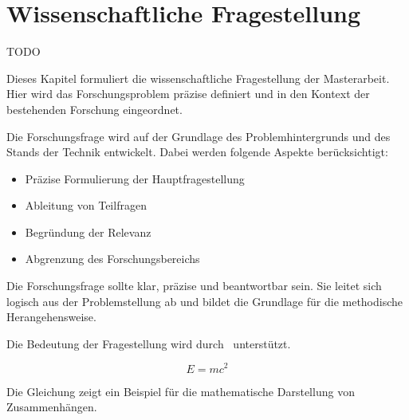 
\chapter{Wissenschaftliche Fragestellung}\label{cha:researchQuestion}

TODO

Dieses Kapitel formuliert die wissenschaftliche Fragestellung der Masterarbeit.
Hier wird das Forschungsproblem präzise definiert und in den Kontext der bestehenden Forschung eingeordnet.

Die Forschungsfrage wird auf der Grundlage des Problemhintergrunds und des Stands der Technik entwickelt.
Dabei werden folgende Aspekte berücksichtigt:

\begin{itemize}[leftmargin=0.63cm, label=\textbullet]
    \item Präzise Formulierung der Hauptfragestellung
    \item Ableitung von Teilfragen
    \item Begründung der Relevanz
    \item Abgrenzung des Forschungsbereichs
\end{itemize}

Die Forschungsfrage sollte klar, präzise und beantwortbar sein. 
Sie leitet sich logisch aus der Problemstellung ab und bildet die Grundlage für die methodische Herangehensweise.

Die Bedeutung der Fragestellung wird durch~\cite{beispiel2024} unterstützt.

\begin{equation}
\label{eq:beispiel}
E = mc^2
\end{equation}

Die Gleichung zeigt ein Beispiel für die mathematische Darstellung von Zusammenhängen.

